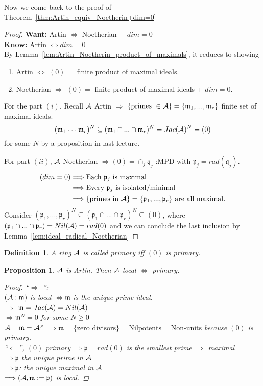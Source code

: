 \documentclass[11pt]{article}
\newtheorem{prop}[thm]{Proposition}
\newtheorem{dfn}[thm]{Definition}
\newcommand{\scm}{{\mathfrak m}}
\newcommand{\scp}{{\mathfrak p}}
\newcommand{\scq}{\mathfrak q}
\newcommand{\cala}{{\cal A}}
\newcommand{\Lrta}{\Longrightarrow}
\newcommand{\Llta}{\Longleftarrow}
\newcommand{\Llrta}{\Longleftrightarrow}
\begin{document}
Now we come back to the proof of Theorem~\ref{thm:Artin_equiv_Noetherin+dim=0}
\begin{proof}
\textbf{Want:} Artin $\Llrta $ Noetherian + $dim=0$\\
\textbf{Know:} Artin $\Llrta dim=0$\\
By Lemma~\ref{lem:Artin_Noetherin_product_of_maximals}, it reduces to showing 
\begin{enumerate}[label=(\roman*)]
\item Artin $\Llrta $ $(0)=$ finite product of maximal ideals.
\item Noetherian $\Lrta $ $(0)=$ finite product of maximal ideals + $dim=0$.
\end{enumerate}

For the part $(i)$. Recall $\cala$ Artin $\Lrta $ $\{\text{primes }\in \cala\}=\{\scm_1,...,\scm_r\}$ finite set of maximal ideals.
$$
(\scm_1\cdot \cdot \cdot \scm_r)^N\subseteq (\scm_1\cap ...\cap \scm_r)^N=Jac(\cala)^N=(0)
$$
for some $N$ by a proposition in last lecture.

For part $(ii)$, $\cala$ Noetherian $\Lrta (0)=\cap_j\scq_j$ :MPD with $\scp_j=rad(\scq_j)$.
$$
\begin{aligned}
(dim=0)& \Lrta\text{Each $\scp_j$ is maximal}\\
& \Lrta \text{Every $\scp_j$ is isolated/minimal}\\
& \Lrta \text{\{primes in $\cala$\}}=\{\scp_1,...,\scp_r\} \text{ are all maximal.}
\end{aligned}
$$
Consider $(\scp_1,...,\scp_r)^N\subseteq (\scp_1\cap...\cap\scp_r)^N\subseteq (0)$, where $(\scp_1\cap...\cap \scp_r)=Nil(\cala)=rad(0)$ and we can conclude the last inclusion by Lemma~\ref{lem:ideal_radical_Noetherian}
\end{proof}
\begin{dfn}
A ring $\cala$ is called primary iff $(0)$ is primary.
\end{dfn}

\begin{prop}
$\cala$ is Artin. Then $\cala$ local $\Llrta $ primary.
\begin{proof}
``$\Lrta$ '':\\
$(\cala:\scm)$ is local $\Llrta \scm $ is the unique prime ideal.\\
$\Lrta$ $\scm=Jac(\cala)=Nil(\cala)$\\
$\Lrta\scm^N=0$ for some $N\geq 0$\\
$\cala-\scm=\cala^\times$
$\Lrta\scm=\{\text{zero divisors}\}=\text{Nilpotents}=\text{Non-units}$ because $(0)$ is primary.\\
``$\Llta$'', $(0)$ primary $\Lrta \scp=rad(0)$ is the smallest prime $\Lrta$ maximal\\
$\Lrta\scp$ the unique prime in $\cala$\\
$\Lrta\scp$: the unique maximal in $\cala$\\
$\Lrta(\cala,\scm:=\scp)$ is local.

\end{proof}
\end{prop}
\end{document}
